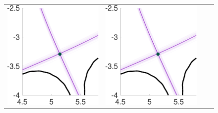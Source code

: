 \documentclass{beamer}
\begin{document}
\begin{frame}[t]
\begin{itemize}[leftmargin=5pt]
\begin{figure}[ht!]
{\begin{tabular}{cccc}
\includegraphics[width=1\linewidth]{QoI_MC_uniform_xptRegion.pdf} 
&\includegraphics[width=1\linewidth]{QoI_MC_surrogate_xptRegion.pdf}

\end{tabular}}
\end{figure}
\end{itemize}
\end{frame}
\end{document}
